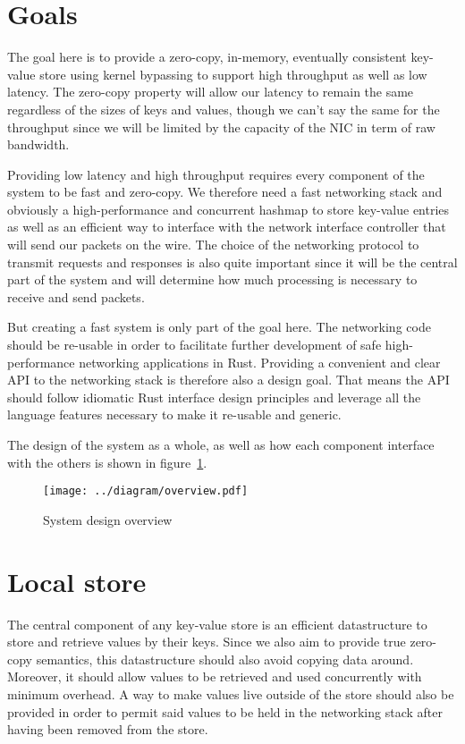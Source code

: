 \section{Goals} \label{design-goals}

The goal here is to provide a zero-copy, in-memory, eventually
consistent key-value store using kernel bypassing to support high
throughput as well as low latency. The zero-copy property will allow
our latency to remain the same regardless of the sizes of keys and
values, though we can't say the same for the throughput since we will
be limited by the capacity of the NIC in term of raw bandwidth.

Providing low latency and high throughput requires every component of
the system to be fast and zero-copy. We therefore need a fast
networking stack and obviously a high-performance and concurrent
hashmap to store key-value entries as well as an efficient way to
interface with the network interface controller that will send our
packets on the wire. The choice of the networking protocol to transmit
requests and responses is also quite important since it will be the
central part of the system and will determine how much processing is
necessary to receive and send packets.

But creating a fast system is only part of the goal here. The
networking code should be re-usable in order to facilitate further
development of safe high-performance networking
applications in Rust. Providing a convenient and clear API to the
networking stack is therefore also a design goal. That means the API
should follow idiomatic Rust interface design principles and leverage
all the language features necessary to make it re-usable and generic.

The design of the system as a whole, as well as how each component
interface with the others is shown in
figure~\ref{fig:design-overview}.

\begin{figure}[htb!]
  \texttt{[image: ../diagram/overview.pdf]}
  \caption{System design overview}
  \label{fig:design-overview}
\end{figure}

\section{Local store} \label{sec:local-store-design}

The central component of any key-value store is an efficient
datastructure to store and retrieve values by their keys. Since we
also aim to provide true zero-copy semantics, this datastructure
should also avoid copying data around. Moreover, it should allow
values to be retrieved and used concurrently with minimum overhead.
A way to make values live outside of the store should also be provided
in order to permit said values to be held in the networking stack
after having been removed from the store.

